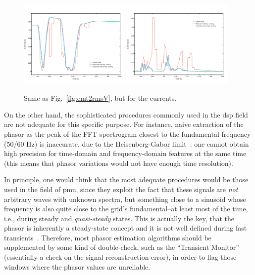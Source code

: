 \documentclass[11pt, a4paper, twoside, titlepage]{article}
\begin{document}
\begin{figure}[t]
\centering
\includegraphics[width=0.48\textwidth]{figs/Fig_emt2rms_exampleI_PS.pdf}
\hfill
\includegraphics[width=0.48\textwidth]{figs/Fig_emt2rms_exampleI_NS.pdf}
\caption{Same as Fig.~\ref{fig:emt2rmsV}, but for the currents.}
\label{fig:emt2rmsI}
\end{figure}

On the other hand, the sophisticated procedures commonly used in the \ac{dsp}
field are not adequate for this specific purpose. For instance, naive extraction
of the phasor as the peak of the FFT spectrogram closest to the fundamental
frequency (50/60 Hz) is inaccurate, due to the Heisenberg-Gabor
limit~\cite{Smith99}: one cannot obtain high precision for time-domain and
frequency-domain features at the same time (this means that phasor variations
would not have enough time resolution).

In principle, one would think that the most adequate procedures would be those
used in the field of \ac{pmu}, since they exploit the fact that these signals
are \emph{not} arbitrary waves with unknown spectra, but something close to a
sinusoid whose frequency is also quite close to the grid's fundamental--at least
most of the time, i.e., during steady and \emph{quasi-steady} states. This is
actually the key, that the phasor is inherently a steady-state concept and it is
not well defined during fast transients~\cite{PhadkeThorp17}. Therefore, most
phasor estimation algorithms should be supplemented by some kind of
double-check, such as the ``Transient Monitor''~\cite{PhadkeThorp17}
(essentially a check on the signal reconstruction error), in order to flag those
windows where the phasor values are unreliable.
\end{document}
